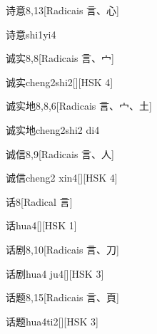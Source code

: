 \begin{entry}{诗意}{8,13}[Radicais ⾔、⼼]
  \begin{phonetics}{诗意}{shi1yi4}
  \end{phonetics}
\end{entry}

\begin{entry}{诚实}{8,8}[Radicais ⾔、⼧]
  \begin{phonetics}{诚实}{cheng2shi2}[][HSK 4]
  \end{phonetics}
\end{entry}

\begin{entry}{诚实地}{8,8,6}[Radicais ⾔、⼧、⼟]
  \begin{phonetics}{诚实地}{cheng2shi2 di4}
  \end{phonetics}
\end{entry}

\begin{entry}{诚信}{8,9}[Radicais ⾔、⼈]
  \begin{phonetics}{诚信}{cheng2 xin4}[][HSK 4]
  \end{phonetics}
\end{entry}

\begin{entry}{话}{8}[Radical ⾔]
  \begin{phonetics}{话}{hua4}[][HSK 1]
  \end{phonetics}
\end{entry}

\begin{entry}{话剧}{8,10}[Radicais ⾔、⼑]
  \begin{phonetics}{话剧}{hua4 ju4}[][HSK 3]
  \end{phonetics}
\end{entry}

\begin{entry}{话题}{8,15}[Radicais ⾔、⾴]
  \begin{phonetics}{话题}{hua4ti2}[][HSK 3]
  \end{phonetics}
\end{entry}

